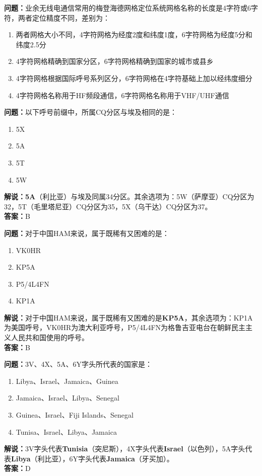 \bigskip


\noindent\textbf{问题：}业余无线电通信常用的梅登海德网格定位系统网格名称的长度是4字符或6字符，两者定位精度不同，差别为：
\begin{enumerate}[label=\Alph*), leftmargin=3em]
\item 两者网格大小不同，4字符网格为经度2度和纬度1度，6字符网格为经度5分和纬度2.5分
\item 4字符网格精确到国家分区，6字符网格精确到国家的城市或县乡
\item 4字符网格根据国际呼号系列区分，6字符网格在4字符基础上加以经纬度细分
\item 4字符网格名称用于HF频段通信，6字符网格名称用于VHF/UHF通信
\end{enumerate}

\bigskip

\noindent\textbf{问题：}以下呼号前缀中，所属CQ分区与埃及相同的是：
\begin{enumerate}[label=\Alph*), leftmargin=3em]
	\item 5X
	\item 5A
	\item 5T
	\item 5W
\end{enumerate}
\noindent\textbf{解说：}\textbf{5A}（利比亚）与埃及同属34分区。其余选项为：5W（萨摩亚）CQ分区为32，5T（毛里塔尼亚）CQ分区为35，5X（乌干达）CQ分区为37。\\\noindent\textbf{答案：}B

\bigskip


\noindent\textbf{问题：}对于中国HAM来说，属于既稀有又困难的是：
\begin{enumerate}[label=\Alph*), leftmargin=3em]
	\item VK0HR
	\item KP5A
	\item P5/4L4FN
	\item KP1A
\end{enumerate}
\noindent\textbf{解说：}对于中国HAM来说，属于既稀有又困难的是\textbf{KP5A}，其余选项为：KP1A为美国呼号，VK0HR为澳大利亚呼号，P5/4L4FN为格鲁吉亚电台在朝鲜民主主义人民共和国使用的呼号。\\\noindent\textbf{答案：}B

\bigskip


\noindent\textbf{问题：}3V、4X、5A、6Y字头所代表的国家是：
\begin{enumerate}[label=\Alph*), leftmargin=3em]
	\item Libya、Israel、Jamaica、Guinea
	\item Jamaica、Israel、Libya、Senegal
	\item Guinea、Israel、Fiji Islands、Senegal
	\item Tunisa、Israel、Libya、Jamaica%
\end{enumerate}
\noindent\textbf{解说：}3V字头代表\textbf{Tunisia}（突尼斯），4X字头代表\textbf{Israel}（以色列），5A字头代表\textbf{Libya}（利比亚），6Y字头代表\textbf{Jamaica}（牙买加）。\\\noindent\textbf{答案：}D


